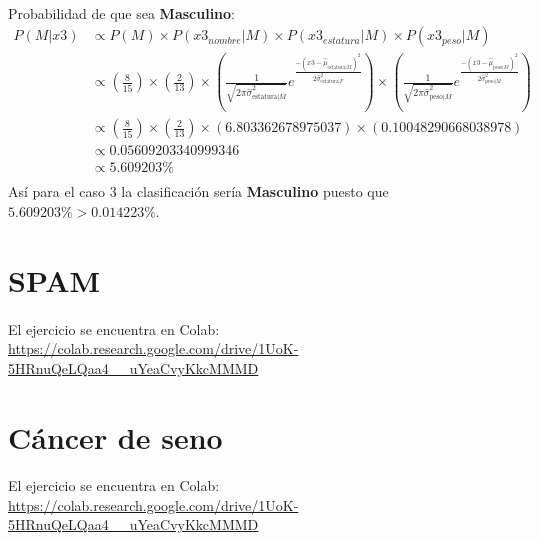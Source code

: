 \documentclass[12pt]{article}
\begin{document}
\paragraph{}Probabilidad de que sea \textbf{Masculino}:\\
\begin{equation}
\begin{split}
P(M|x3) &\propto P(M) \times P(x3_{nombre}|M) \times P(x3_{estatura}|M) \times P(x3_{peso}|M) \\
&\propto (\frac{8}{15}) \times (\frac{2}{13}) \times (\frac{1}{\sqrt{2\pi\hat{\sigma}_{\text{estatura}|M}^2}}e^{\frac{-(x3 - \hat{\mu}_{\text{estatura}|M})^2}{2\hat{\sigma}_{\text{estatura}|F}^2}}) \times (\frac{1}{\sqrt{2\pi\hat{\sigma}_{\text{peso}|M}^2}}e^{\frac{-(x3 - \hat{\mu}_{\text{peso}|M})^2}{2\hat{\sigma}_{\text{peso}|M}^2}}) \\
&\propto (\frac{8}{15}) \times (\frac{2}{13}) \times (6.803362678975037) \times (0.10048290668038978) \\
&\propto 0.05609203340999346 \\
&\propto 5.609203 \% \\
\end{split}
\end{equation}
Así para el caso 3 la clasificación sería \textbf{Masculino} puesto que $5.609203\% > 0.014223\%$.\\
\clearpage
\pagebreak
\section{SPAM}
\paragraph{}El ejercicio se encuentra en Colab:\\
\url{https://colab.research.google.com/drive/1UoK-5HRnuQeLQaa4__uYeaCvyKkcMMMD}
\section{Cáncer de seno}
\paragraph{}El ejercicio se encuentra en Colab:\\
\url{https://colab.research.google.com/drive/1UoK-5HRnuQeLQaa4__uYeaCvyKkcMMMD}  
\end{document}
